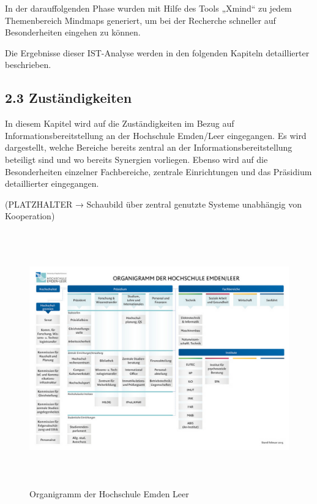 \documentclass[a4paper]{article}
\begin{document}
\bigskip

{\sffamily\mdseries\color{black}
In der darauffolgenden Phase wurden mit Hilfe des Tools „Xmind“ zu jedem Themenbereich Mindmaps generiert, um bei der
Recherche schneller auf Besonderheiten eingehen zu können.}


\bigskip

{\sffamily\mdseries\color{black}
Die Ergebnisse dieser IST-Analyse werden in den folgenden Kapiteln detaillierter beschrieben. }


\bigskip


\bigskip

\subsection[2.3 Zuständigkeiten]{\bfseries 2.3 Zuständigkeiten}
{\sffamily\mdseries\color{black}
In diesem Kapitel wird auf die Zuständigkeiten im Bezug auf Informationsbereitstellung an der Hochschule Emden/Leer
eingegangen. Es wird dargestellt, welche Bereiche bereits zentral an der Informationsbereitstellung beteiligt sind und
wo bereits Synergien vorliegen. Ebenso wird auf die Besonderheiten einzelner Fachbereiche, zentrale Einrichtungen und
das Präsidium detaillierter eingegangen. }

{\sffamily\color[rgb]{0.77254903,0.0,0.043137256}
(PLATZHALTER → Schaubild über zentral genutzte Systeme unabhängig von Kooperation)}

\begin{figure}
\centering
\includegraphics[width=15.501cm,height=11.003cm]{EntwurfKapitel2Gruppe220150528VW-img/EntwurfKapitel2Gruppe220150528VW-img005.png}
\caption[Organigramm der Hochschule Emden Leer]{Organigramm der Hochschule Emden Leer}

\end{figure}
\end{document}
